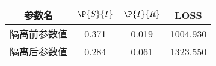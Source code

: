 \begin{tabular}{cccc}
\hline
参数名&$\P{S}{I}$&$\P{I}{R}$&LOSS\\
\hline
隔离前参数值&0.371&0.019&1004.930\\
隔离后参数值&0.284&0.061&1323.550\\
\hline
\end{tabular}